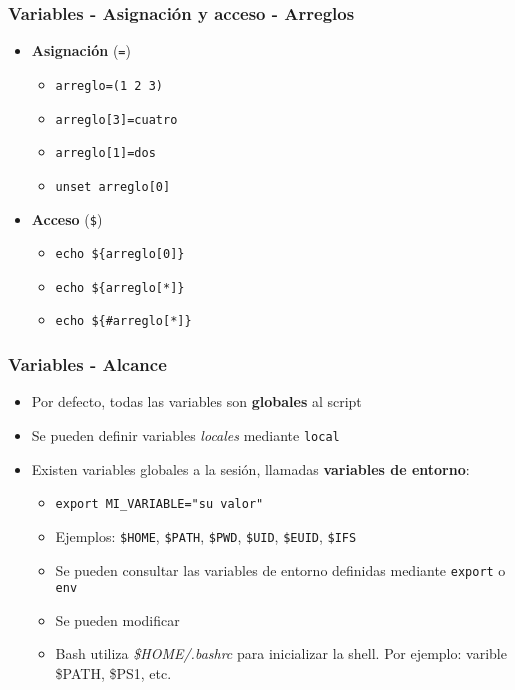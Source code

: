 \begin{frame}
  \frametitle{Variables - Asignación y acceso - Arreglos}
  \begin{itemize}
    \item \textbf{Asignación} (\texttt{=})
    \begin{itemize}
      \item \texttt{arreglo=(1 2 3)}
      \item \texttt{arreglo[3]=cuatro}
      \item \texttt{arreglo[1]=dos}
      \item \texttt{unset arreglo[0]}
    \end{itemize}
    \item \textbf{Acceso} (\texttt{\${}})
    \begin{itemize}
      \item \texttt{echo \$\{arreglo[0]\}}
      \item \texttt{echo \$\{arreglo[*]\}}
      \item \texttt{echo \$\{\#arreglo[*]\}}
    \end{itemize}
  \end{itemize}
\end{frame}

\begin{frame}
  \frametitle{Variables - Alcance}
  \begin{itemize}
    \item Por defecto, todas las variables son \textbf{globales} al script
    \item Se pueden definir variables \textit{locales} mediante \texttt{local}
    \item Existen variables globales a la sesión, llamadas \textbf{variables de entorno}:
    \begin{itemize}
      \item \texttt{export MI\_VARIABLE=\string"su valor\string"}
      \item Ejemplos: \texttt{\$HOME}, \texttt{\$PATH}, \texttt{\$PWD}, \texttt{\$UID}, \texttt{\$EUID}, \texttt{\$IFS}
      \item Se pueden consultar las variables de entorno definidas mediante \texttt{export} o \texttt{env}
      \item Se pueden modificar
      \item Bash utiliza \textit{\$HOME/.bashrc} para inicializar la shell. Por ejemplo: varible \$PATH, \$PS1, etc.
    \end{itemize}
  \end{itemize}
\end{frame}

